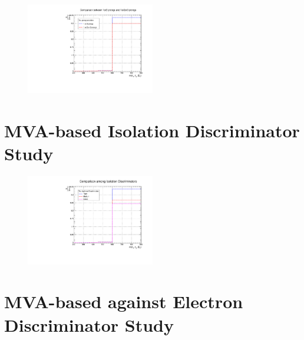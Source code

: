 \begin{figure}[ht]
\begin{center}
\captionsetup[subfloat]{farskip=0pt,captionskip=0.0cm,labelformat=empty}
\includegraphics[clip,width=0.5\textwidth]{figuras/AppendiceB/2prongs/prongsComparison.pdf}
\end{center}
\end{figure}

\section{MVA-based Isolation Discriminator Study}
\label{Results:TauID-isoDicr}

\begin{figure}[ht]
\begin{center}
\captionsetup[subfloat]{farskip=0pt,captionskip=0.0cm,labelformat=empty}
\includegraphics[clip,width=0.5\textwidth]{figuras/AppendiceB/IsoDiscr/IsoDiscrComparison.pdf}
\end{center}
\end{figure}

\section{MVA-based against Electron Discriminator Study}
\label{Results:TauID-isoDicr}

